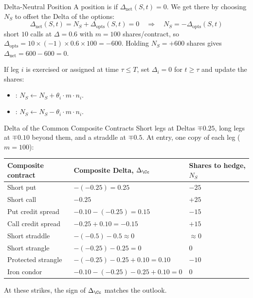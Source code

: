 \begin{frame}{Delta-Neutral Position}
  A position is  if $\Delta_{\text{net}}(S,t)=0$. We get
  there by choosing $N_{S}$ to offset the Delta of the options:
  \begin{equation*}
    \Delta_{\text{net}}(S,t)= N_{S} + \Delta_{\text{opts}}(S,t) = 0
    \quad\Rightarrow\quad
    N_{S} = - \Delta_{\text{opts}}(S,t)
  \end{equation*}
  \textbf{} short $10$ calls at $\Delta=0.6$ with
  $m=100$ shares/contract, so $\Delta_{\text{opts}}=10\times(-1)\times0.6\times100=-600$.
  Holding $N_{S}=+600$ shares gives $\Delta_{\text{net}}=600-600=0$.

  \vspace{0.5em}
  If leg $i$ is exercised or assigned at time $\tau\leq T$, set $\Delta_{i}=0$
  for $t\geq\tau$ and update the shares:
  \begin{itemize}\setlength{\itemsep}{0.2em}
    \item {}: $N_{S}\gets N_{S}+\theta_{i}\cdot m\cdot n_{i}$.
    \item {}: $N_{S}\gets N_{S}-\theta_{i}\cdot m\cdot n_{i}$.
  \end{itemize}
\end{frame}

\begin{frame}{Delta of the Common Composite Contracts}
  Short legs at Deltas $\mp0.25$, long legs at $\mp0.10$ beyond them, and a
  straddle at $\mp0.5$. At entry, one copy of each leg ($m=100$):
  \begin{center}\small
    \begin{tabular}{lll}
      \toprule
      Composite contract & Composite Delta, $\Delta_{\Cc}$ & Shares to hedge, $N_{S}$ \\
      \midrule
      Short put & $-(-0.25)=0.25$ & $-25$ \\
      Short call & $-0.25$ & $+25$ \\
      Put credit spread & $-0.10-(-0.25)=0.15$ & $-15$ \\
      Call credit spread & $-0.25+0.10=-0.15$ & $+15$ \\
      Short straddle & $-(-0.5)-0.5\approx0$ & $\approx0$ \\
      Short strangle & $-(-0.25)-0.25=0$ & $0$ \\
      Protected strangle & $-(-0.25)-0.25+0.10=0.10$ & $-10$ \\
      Iron condor & $-0.10-(-0.25)-0.25+0.10=0$ & $0$ \\
      \bottomrule
    \end{tabular}
  \end{center}
  At these strikes, the sign of $\Delta_{\Cc}$ matches the outlook.
\end{frame}


